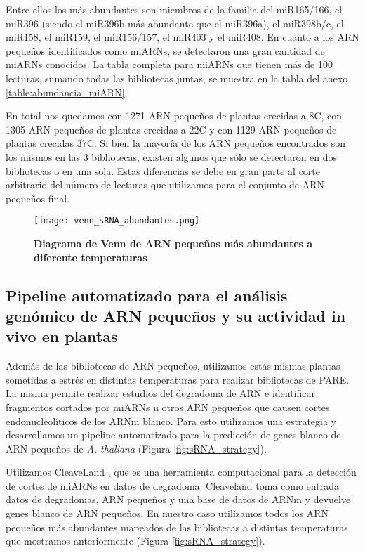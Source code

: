 Entre ellos los más abundantes son miembros de la familia del miR165/166, el miR396 (siendo el miR396b más abundante que el miR396a), el miR398b/c, el miR158, el miR159, el miR156/157, el miR403 y el miR408.
En cuanto a los ARN pequeños identificados como miARNs, se detectaron una gran cantidad de miARNs conocidos.
La tabla completa para miARNs que tienen más de 100 lecturas, sumando todas las bibliotecas juntas, se muestra en la tabla del anexo \ref{table:abundancia_miARN}.

En total nos quedamos con 1271 ARN pequeños de plantas crecidas a 8\degree C, con 1305 ARN pequeños de plantas crecidas a 22\degree C y con 1129 ARN pequeños de plantas crecidas 37\degree C.
Si bien la mayoría de los ARN pequeños encontrados son los mismos en las 3 bibliotecas, existen algunos que sólo se detectaron en dos bibliotecas o en una sola.
Estas diferencias se debe en gran parte al corte arbitrario del número de lecturas que utilizamos para el conjunto de ARN pequeños final.
 
\begin{figure}[htbp!] 
    \centering    
    \texttt{[image: venn\_sRNA\_abundantes.png]}
    \caption[Diagrama de Venn de ARN pequeños más abundantes a diferente temperaturas]{
    \textbf{Diagrama de Venn de ARN pequeños más abundantes a diferente temperaturas}
    }
        
     \label{fig:venn_sRNA_abundantes}
\end{figure}

\subsection{Pipeline automatizado para el análisis genómico de ARN pequeños y su actividad in vivo en plantas}

Además de las bibliotecas de ARN pequeños, utilizamos estás mismas plantas sometidas a estrés en distintas temperaturas para realizar bibliotecas de PARE\citep{pmid19247285}.
La misma permite realizar estudios del degradoma de ARN e identificar fragmentos cortados por miARNs u otros ARN pequeños que causen cortes endonucleolíticos de los ARNm blanco.
Para esto utilizamos una estrategia y desarrollamos un pipeline automatizado para la predicción de genes blanco de ARN pequeños de \textit{A. thaliana} (Figura \ref{fig:sRNA_strategy}).

Utilizamos CleaveLand \citep{pmid19017659}, que es una herramienta computacional para la detección de cortes de miARNs en datos de degradoma.
Cleaveland toma como entrada datos de degradomas, ARN pequeños y una base de datos de ARNm y devuelve genes blanco de ARN pequeños.
En nuestro caso utilizamos todos los ARN pequeños más abundantes mapeados de las bibliotecas a distintas temperaturas que mostramos anteriormente (Figura \ref{fig:sRNA_strategy}).

